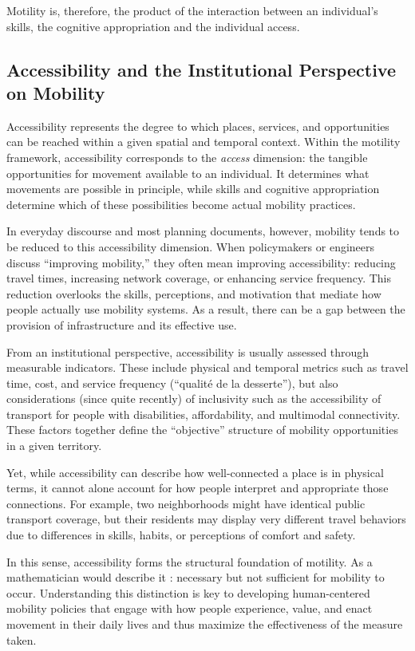 Motility is, therefore, the product of the interaction between an individual's skills, the cognitive appropriation and the individual access.

\subsection{Accessibility and the Institutional Perspective on Mobility}

Accessibility represents the degree to which places, services, and opportunities can be reached within a given spatial and temporal context. Within the motility framework, accessibility corresponds to the \textit{access} dimension: the tangible opportunities for movement available to an individual. It determines what movements are possible in principle, while skills and cognitive appropriation determine which of these possibilities become actual mobility practices.

In everyday discourse and most planning documents, however, mobility tends to be reduced to this accessibility dimension. When policymakers or engineers discuss “improving mobility,” they often mean improving accessibility: reducing travel times, increasing network coverage, or enhancing service frequency. This reduction overlooks the skills, perceptions, and motivation that mediate how people actually use mobility systems. As a result, there can be a gap between the provision of infrastructure and its effective use.

From an institutional perspective, accessibility is usually assessed through measurable indicators. These include physical and temporal metrics such as travel time, cost, and service frequency (“qualité de la desserte”), but also considerations (since quite recently) of inclusivity such as the accessibility of transport for people with disabilities, affordability, and multimodal connectivity. These factors together define the “objective” structure of mobility opportunities in a given territory.

Yet, while accessibility can describe how well-connected a place is in physical terms, it cannot alone account for how people interpret and appropriate those connections. For example, two neighborhoods might have identical public transport coverage, but their residents may display very different travel behaviors due to differences in skills, habits, or perceptions of comfort and safety.

In this sense, accessibility forms the structural foundation of motility. As a mathematician would describe it : necessary but not sufficient for mobility to occur. Understanding this distinction is key to developing human-centered mobility policies that engage with how people experience, value, and enact movement in their daily lives and thus maximize the effectiveness of the measure taken.


